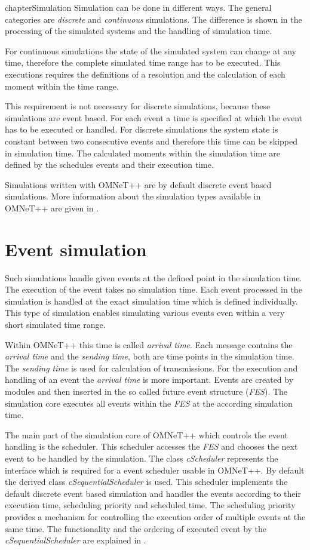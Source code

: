 chapter{Simulation}
\label{sec:Simulation}
Simulation can be done in different ways. The general categories are \emph{discrete} and \emph{continuous} simulations.
The difference is shown in the processing of the simulated systems and the handling of simulation time.

For continuous simulations the state of the simulated system can change at any time, therefore the complete simulated time range has to be executed.
This executions requires the definitions of a resolution and the calculation of each moment within the time range.

This requirement is not necessary for discrete simulations, because these simulations are event based.
For each event a time is specified at which the event has to be executed or handled.
For discrete simulations the system state is constant between two consecutive events and therefore this time can be skipped in simulation time.
The calculated moments within the simulation time are defined by the schedules events and their execution time.

Simulations written with OMNeT++ are by default discrete event based simulations.
More information about the simulation types available in OMNeT++ are given in \cite[section 4.1]{OMNETMANUAL}.

\section{Event simulation}
\label{sec:EventSimulation}
Such simulations handle given events at the defined point in the simulation time.
The execution of the event takes no simulation time.
Each event processed in the simulation is handled at the exact simulation time which is defined individually.
This type of simulation enables simulating various events even within a very short simulated time range.

Within OMNeT++ this time is called \emph{arrival time}.
Each message contains the \emph{arrival time} and the \emph{sending time}, both are time points in the simulation time.
The \emph{sending time} is used for calculation of transmissions.
For the execution and handling of an event the \emph{arrival time} is more important.
Events are created by modules and then inserted in the so called future event structure (\emph{FES}).
The simulation core executes all events within the \emph{FES} at the according simulation time.

The main part of the simulation core of OMNeT++ which controls the event handling is the scheduler.
This scheduler accesses the \emph{FES} and chooses the next event to be handled by the simulation.
The class \emph{cScheduler} represents the interface which is required for a event scheduler usable in OMNeT++.
By default the derived class \emph{cSequentialScheduler} is used.
This scheduler implements the default discrete event based simulation and handles the events according to their execution time, scheduling priority and scheduled time.
The scheduling priority provides a mechanism for controlling the execution order of multiple events at the same time.
The functionality and the ordering of executed event by the \emph{cSequentialScheduler} are explained in \cite[section 4.1]{OMNETMANUAL}.

